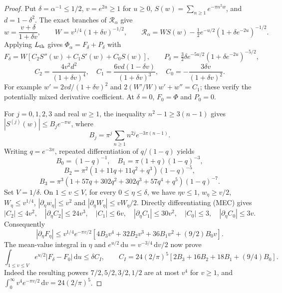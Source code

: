\documentclass[11pt]{article}
\theoremstyle{remark}\newtheorem{remark}[theorem]{Remark}
\newcommand{\dd}{\,\mathrm d}
\begin{document}
\begin{proof}
Put $\delta=\alpha^{-1}\le1/2$, $v=e^{2u}\ge1$ for $u\ge0$,
$S(w)=\sum_{n\ge1}e^{-\pi n^2w}$, and $d=1-\delta^2$.
The exact branches of $\mathcal R_\alpha$ give
\[
 w=\frac{v+\delta}{1+\delta v},\qquad
 W=v^{1/4}(1+\delta v)^{-1/2},\qquad
 \mathcal R_\alpha=WS(w)-\tfrac12e^{-u/2}
                                   (1+\delta e^{-2u})^{-1/2}.
\]
Applying $L_{\rm th}$ gives $\Phi_\alpha=F_\delta+P_\delta$ with
\[
 F_\delta=W[C_2S''(w)+C_1S'(w)+C_0S(w)],\qquad
 P_\delta=\tfrac32\delta e^{-5u/2}
                              (1+\delta e^{-2u})^{-5/2},
\]
\[
 C_2=\frac{4v^2d^2}{(1+\delta v)^4},\quad
 C_1=\frac{6vd(1-\delta v)}{(1+\delta v)^3},\quad
 C_0=-\frac{3\delta v}{(1+\delta v)^2}. \tag{MEC}
\]
For example $w'=2vd/(1+\delta v)^2$ and
$2(W'/W)w'+w''=C_1$; these verify the potentially mixed derivative
coefficient. At $\delta=0$, $F_0=\Phi$ and $P_0=0$.

For $j=0,1,2,3$ and real $w\ge1$, the inequality
$n^2-1\ge3(n-1)$ gives $|S^{(j)}(w)|\le B_je^{-\pi w}$, where
\[
 B_j=\pi^j\sum_{n\ge1}n^{2j}e^{-3\pi(n-1)}.
\]
Writing $q=e^{-3\pi}$, repeated differentiation of $q/(1-q)$ yields
\[
 B_0=(1-q)^{-1},\quad B_1=\pi(1+q)(1-q)^{-3},
\]
\[
 B_2=\pi^2(1+11q+11q^2+q^3)(1-q)^{-5},
\]
\[
 B_3=\pi^3(1+57q+302q^2+302q^3+57q^4+q^5)(1-q)^{-7}.
\]
Set $V=1/\delta$. On $1\le v\le V$, for every
$0\le\eta\le\delta$, we have $\eta v\le1$, $w_\eta\ge v/2$,
$W_\eta\le v^{1/4}$, $|\partial_\eta w_\eta|\le v^2$ and
$|\partial_\eta W_\eta|\le vW_\eta/2$.
Directly differentiating (MEC) gives
\[
 |C_2|\le4v^2,\quad |\partial_\eta C_2|\le24v^3,
 \quad |C_1|\le6v,\quad |\partial_\eta C_1|\le30v^2,
 \quad |C_0|\le3,\quad |\partial_\eta C_0|\le3v.
\]
Consequently
\[
 |\partial_\eta F_\eta|
 \le v^{1/4}e^{-\pi v/2}
       [4B_3v^4+32B_2v^3+36B_1v^2+(9/2)B_0v].
\]
The mean-value integral in $\eta$ and
$e^{u/2}\dd u=v^{-3/4}\dd v/2$ now prove
\[
 \int_{1\le v\le V}e^{u/2}|F_\delta-F_0|\dd u\le\delta C_I,
 \qquad
 C_I=24(2/\pi)^5[2B_3+16B_2+18B_1+(9/4)B_0].
\]
Indeed the resulting powers $7/2,5/2,3/2,1/2$ are at most $v^4$
for $v\ge1$, and $\int_0^\infty v^4e^{-\pi v/2}\dd v=24(2/\pi)^5$.


\end{proof}
\end{document}
